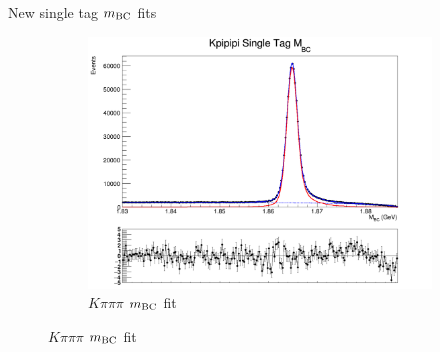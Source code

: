 \documentclass{beamer}
\begin{document}
\begin{frame}{New single tag $m_{\rm BC}$ fits}
\begin{figure}
\begin{subfigure}{0.38\textwidth}
      \centering
      \includegraphics[width=\textwidth]{Plots/Kpipipi_SingleTag_MBC_Plot.png}
      \caption{$K\pi\pi\pi$ $m_{\rm BC}$ fit}
    \end{subfigure}
  \end{figure}
\end{frame}
\end{document}
